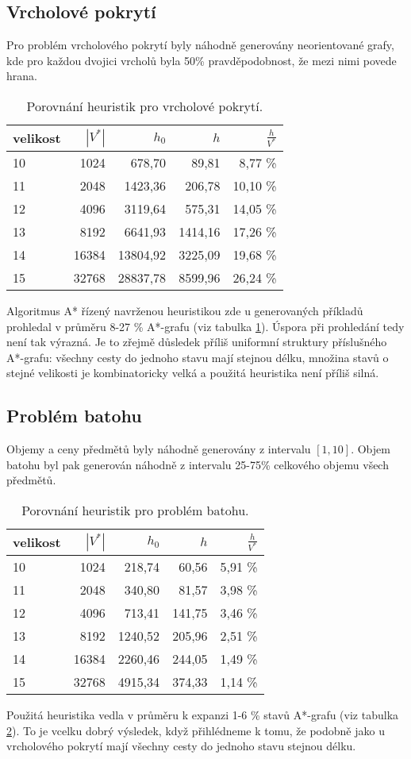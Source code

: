 \documentclass[12pt,notitlepage,fleqn]{report} %
\theoremstyle{definition}
\begin{document}
\subsection{Vrcholové pokrytí}
Pro problém vrcholového pokrytí byly náhodně generovány neorientované grafy, kde pro každou dvojici vrcholů byla 50\% pravděpodobnost, že mezi nimi povede hrana.
\begin{table}[h]
\label{tab-heur-vp}
\begin{center}
\begin{tabular}{l|rrrr}
velikost & $|V^*|$ & $h_0$ & $h$ & $\frac{h}{V^*}$ \\ \hline 
10&1024 &678,70   &89,81   &8,77 \% \\
11&2048 &1423,36 &206,78  &10,10 \%\\
12&4096 &3119,64 &575,31  &14,05 \%\\
13&8192 &6641,93 &1414,16 &17,26 \%\\
14&16384&13804,92&3225,09 &19,68 \%\\
15&32768&28837,78&8599,96 &26,24 \%
\end{tabular}
\end{center}
\caption{Porovnání heuristik pro vrcholové pokrytí.}
\end{table}
Algoritmus A* řízený navrženou heuristikou zde u generovaných příkladů prohledal v průměru 8-27 \% A*-grafu (viz tabulka \ref{tab-heur-vp}). Úspora při prohledání tedy není tak výrazná. Je to zřejmě důsledek příliš uniformní struktury příslušného A*-grafu: všechny cesty do jednoho stavu mají stejnou délku, množina stavů o stejné velikosti je kombinatoricky velká a použitá heuristika není příliš silná.

\subsection{Problém batohu}
Objemy a ceny předmětů byly náhodně generovány z intervalu $[1,10]$. Objem batohu byl pak generován náhodně z intervalu 25-75\% celkového objemu všech předmětů.
\begin{table}[h]
\label{tab-heur-pb}
\begin{center}
\begin{tabular}{l|rrrr}
velikost & $|V^*|$ & $h_0$ & $h$ & $\frac{h}{V^*}$ \\ \hline 
10&1024 &218,74 &60,56  &5,91 \%\\
11&2048 &340,80  &81,57  &3,98 \%\\
12&4096 &713,41 &141,75 &3,46 \%\\
13&8192 &1240,52&205,96 &2,51 \%\\
14&16384&2260,46&244,05 &1,49 \%\\
15&32768&4915,34&374,33 &1,14 \%
\end{tabular}
\end{center}
\caption{Porovnání heuristik pro problém batohu.}
\end{table}
Použitá heuristika vedla v průměru k expanzi 1-6 \% stavů A*-grafu (viz tabulka \ref{tab-heur-pb}). To je vcelku dobrý výsledek, když přihlédneme k tomu, že podobně jako u vrcholového pokrytí mají všechny cesty do jednoho stavu stejnou délku.
\end{document}
